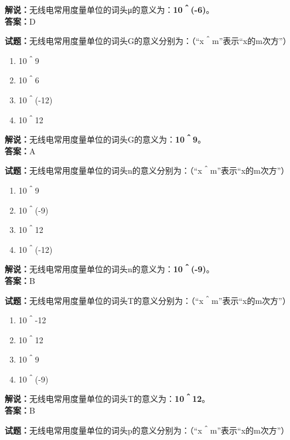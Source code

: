 \documentclass{ctexbook}
\begin{document}
\noindent\textbf{解说：}无线电常用度量单位的词头μ的意义为：\textbf{10＾(-6)}。\\\noindent\textbf{答案：}D


\bigskip


\noindent\textbf{试题：}无线电常用度量单位的词头G的意义分别为：（“x＾m”表示“x的m次方”）

\begin{enumerate}[leftmargin=3em]
	\item 10＾9
	\item 10＾6
	\item 10＾(-12)
	\item 10＾12
\end{enumerate}

\noindent\textbf{解说：}无线电常用度量单位的词头G的意义为：\textbf{10＾9}。\\\noindent\textbf{答案：}A


\bigskip


\noindent\textbf{试题：}无线电常用度量单位的词头n的意义分别为：（“x＾m”表示“x的m次方”）

\begin{enumerate}[leftmargin=3em]
	\item 10＾9
	\item 10＾(-9)
	\item 10＾12
	\item 10＾(-12)
\end{enumerate}

\noindent\textbf{解说：}无线电常用度量单位的词头n的意义为：\textbf{10＾(-9)}。\\\noindent\textbf{答案：}B


\bigskip


\noindent\textbf{试题：}无线电常用度量单位的词头T的意义分别为：（“x＾m”表示“x的m次方”）

\begin{enumerate}[leftmargin=3em]
	\item 10＾-12
	\item 10＾12
	\item 10＾9
	\item 10＾(-9)
\end{enumerate}

\noindent\textbf{解说：}无线电常用度量单位的词头T的意义为：\textbf{10＾12}。\\\noindent\textbf{答案：}B


\bigskip


\noindent\textbf{试题：}无线电常用度量单位的词头p的意义分别为：（“x＾m”表示“x的m次方”）
\end{document}
